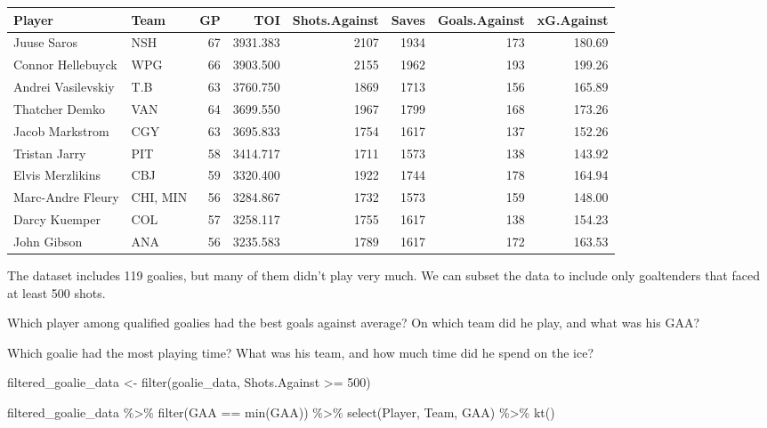 \documentclass[
  11pt,
]{book}
\newenvironment{Shaded}{\begin{snugshade}}{\end{snugshade}}
\newcommand{\DecValTok}[1]{\textcolor[rgb]{0.00,0.00,0.81}{#1}}
\newcommand{\FunctionTok}[1]{\textcolor[rgb]{0.00,0.00,0.00}{#1}}
\newcommand{\NormalTok}[1]{#1}
\newcommand{\OtherTok}[1]{\textcolor[rgb]{0.56,0.35,0.01}{#1}}
\newcommand{\SpecialCharTok}[1]{\textcolor[rgb]{0.00,0.00,0.00}{#1}}
\theoremstyle{definition}
\theoremstyle{definition}
\theoremstyle{definition}
\theoremstyle{definition}
\theoremstyle{remark}
\begin{document}
\begin{table}[H]
\centering
\begin{tabular}{llrrrrrr}
\toprule
Player & Team & GP & TOI & Shots.Against & Saves & Goals.Against & xG.Against\\
\midrule
Juuse Saros & NSH & 67 & 3931.383 & 2107 & 1934 & 173 & 180.69\\
Connor Hellebuyck & WPG & 66 & 3903.500 & 2155 & 1962 & 193 & 199.26\\
Andrei Vasilevskiy & T.B & 63 & 3760.750 & 1869 & 1713 & 156 & 165.89\\
Thatcher Demko & VAN & 64 & 3699.550 & 1967 & 1799 & 168 & 173.26\\
Jacob Markstrom & CGY & 63 & 3695.833 & 1754 & 1617 & 137 & 152.26\\
Tristan Jarry & PIT & 58 & 3414.717 & 1711 & 1573 & 138 & 143.92\\
Elvis Merzlikins & CBJ & 59 & 3320.400 & 1922 & 1744 & 178 & 164.94\\
Marc-Andre Fleury & CHI, MIN & 56 & 3284.867 & 1732 & 1573 & 159 & 148.00\\
Darcy Kuemper & COL & 57 & 3258.117 & 1755 & 1617 & 138 & 154.23\\
John Gibson & ANA & 56 & 3235.583 & 1789 & 1617 & 172 & 163.53\\
\bottomrule
\end{tabular}
\end{table}

The dataset includes 119 goalies, but many of them didn't play very much. We can subset the data to include only goaltenders that faced at least 500 shots.

Which player among qualified goalies had the best goals against average? On which team did he play, and what was his GAA?

Which goalie had the most playing time? What was his team, and how much time did he spend on the ice?

\begin{Shaded}
\begin{Highlighting}[]
\NormalTok{filtered\_goalie\_data }\OtherTok{\textless{}{-}} \FunctionTok{filter}\NormalTok{(goalie\_data, Shots.Against }\SpecialCharTok{\textgreater{}=} \DecValTok{500}\NormalTok{)}

\NormalTok{filtered\_goalie\_data }\SpecialCharTok{\%\textgreater{}\%} \FunctionTok{filter}\NormalTok{(GAA }\SpecialCharTok{==} \FunctionTok{min}\NormalTok{(GAA)) }\SpecialCharTok{\%\textgreater{}\%} \FunctionTok{select}\NormalTok{(Player, Team, GAA) }\SpecialCharTok{\%\textgreater{}\%} \FunctionTok{kt}\NormalTok{()}
\end{Highlighting}
\end{Shaded}
\end{document}
